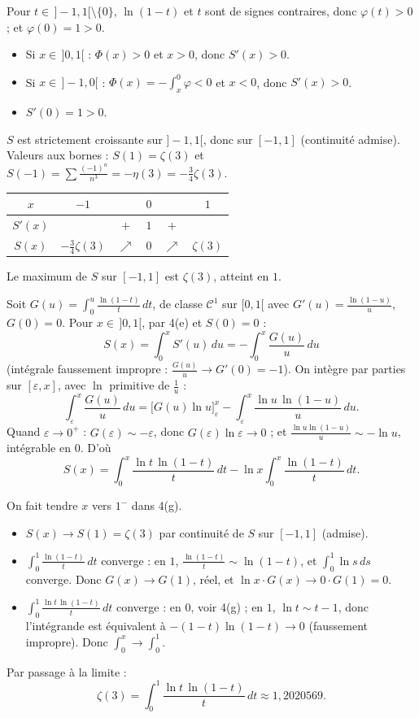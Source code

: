 \documentclass[a4paper,11pt]{article}
\numberwithin{equation}{section}
\numberwithin{figure}{section}
\numberwithin{table}{section}
\theoremstyle{enonce}
\theoremstyle{exemple}
\theoremstyle{remarque}
\newcommand{\Q}[1]{\par\needspace{3\baselineskip}\medskip\noindent{\sffamily\bfseries\color{Bleu}#1}\enspace}
\begin{document}
\Q{4(f)} Pour $t\in\,]-1,1[\setminus\{0\}$, $\ln(1-t)$ et $t$ sont de signes contraires, donc $\varphi(t)>0$ ; et $\varphi(0)=1>0$.
\begin{itemize}[leftmargin=1.2em,itemsep=2pt,topsep=2pt]
\item Si $x\in\,]0,1[$ : $\Phi(x)>0$ et $x>0$, donc $S'(x)>0$.
\item Si $x\in\,]-1,0[$ : $\Phi(x)=-\int_x^0\varphi<0$ et $x<0$, donc $S'(x)>0$.
\item $S'(0)=1>0$.
\end{itemize}
$S$ est strictement croissante sur $]-1,1[$, donc sur $[-1,1]$ (continuité admise). Valeurs aux bornes :
$S(1)=\zeta(3)$ et $S(-1)=\sum\frac{(-1)^n}{n^3}=-\eta(3)=-\frac34\zeta(3)$.
\begin{center}
\renewcommand{\arraystretch}{1.4}
\begin{tabular}{c|ccccc}
$x$ & $-1$ & & $0$ & & $1$\\\hline
$S'(x)$ & & $+$ & $1$ & $+$ & \\\hline
$S(x)$ & $-\frac34\zeta(3)$ & $\nearrow$ & $0$ & $\nearrow$ & $\zeta(3)$
\end{tabular}
\end{center}
Le maximum de $S$ sur $[-1,1]$ est $\zeta(3)$, atteint en $1$.

\Q{4(g)} Soit $G(u)=\int_0^u\frac{\ln(1-t)}t\,dt$, de classe $\mathcal C^1$ sur $[0,1[$ avec $G'(u)=\frac{\ln(1-u)}u$, $G(0)=0$. Pour
$x\in\,]0,1[$, par 4(e) et $S(0)=0$ :
\[S(x)=\int_0^xS'(u)\,du=-\int_0^x\frac{G(u)}u\,du\]
(intégrale faussement impropre : $\frac{G(u)}u\to G'(0)=-1$). On intègre par parties sur $[\varepsilon,x]$, avec $\ln$ primitive de
$\frac1u$ :
\[\int_\varepsilon^x\frac{G(u)}u\,du=\Big[G(u)\ln u\Big]_\varepsilon^x-\int_\varepsilon^x\frac{\ln u\,\ln(1-u)}u\,du .\]
Quand $\varepsilon\to0^+$ : $G(\varepsilon)\sim-\varepsilon$, donc $G(\varepsilon)\ln\varepsilon\to0$ ; et $\frac{\ln u\ln(1-u)}u\sim-\ln u$, intégrable en
$0$. D'où
\[\boxed{S(x)=\int_0^x\frac{\ln t\,\ln(1-t)}t\,dt-\ln x\int_0^x\frac{\ln(1-t)}t\,dt .}\]

\Q{4(h)} On fait tendre $x$ vers $1^-$ dans 4(g).
\begin{itemize}[leftmargin=1.2em,itemsep=2pt,topsep=2pt]
\item $S(x)\to S(1)=\zeta(3)$ par continuité de $S$ sur $[-1,1]$ (admise).
\item $\int_0^1\frac{\ln(1-t)}t\,dt$ converge : en $1$, $\frac{\ln(1-t)}t\sim\ln(1-t)$, et $\int_0^1\ln s\,ds$ converge. Donc $G(x)\to G(1)$,
réel, et $\ln x\cdot G(x)\to0\cdot G(1)=0$.
\item $\int_0^1\frac{\ln t\,\ln(1-t)}t\,dt$ converge : en $0$, voir 4(g) ; en $1$, $\ln t\sim t-1$, donc l'intégrande est équivalent à
$-(1-t)\ln(1-t)\to0$ (faussement impropre). Donc $\int_0^x\to\int_0^1$.
\end{itemize}
Par passage à la limite :
\[\boxed{\zeta(3)=\int_0^1\frac{\ln t\,\ln(1-t)}t\,dt}\approx1{,}2020569 .\]
\end{document}
